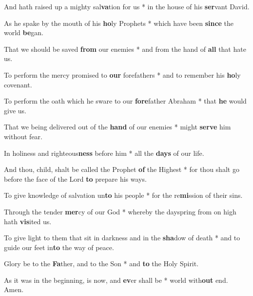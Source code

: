 \begin{multicols}{2}
	And hath raised up a mighty sal\textbf{va}tion for us * in the house of his \textbf{ser}vant David.
	
	As he spake by the mouth of his \textbf{ho}ly Prophets * which have been \textbf{since} the world \textbf{be}gan.
	
	That we should be saved \textbf{from} our enemies * and from the hand of \textbf{all} that hate us.
	
	To perform the mercy promised to \textbf{our} forefathers * and to remember his \textbf{ho}ly covenant.
	
	To perform the oath which he sware to our \textbf{fore}father Abraham * that \textbf{he} would give us.
	
	That we being delivered out of the \textbf{hand} of our enemies * might \textbf{serve} him without fear.
	
	In holiness and righteous\textbf{ness} before him * all the \textbf{days} of our life.
	
	And thou, child, shalt be called the Prophet \textbf{of} the Highest * for thou shalt go before the face of the Lord \textbf{to} prepare his ways.
	
	To give knowledge of salvation un\textbf{to} his people * for the re\textbf{mi}ssion of their sins.
	
	Through the tender \textbf{mer}cy of our God * whereby the dayspring from on high hath \textbf{vis}ited us.
	
	To give light to them that sit in darkness and in the \textbf{sha}dow of death * and to guide our feet in\textbf{to} the way of peace.
	
	Glory be to the \textbf{Fa}ther, and to the Son * and \textbf{to} the Holy Spirit.
	
	As it was in the beginning, is now, and \textbf{ev}er shall be * world with\textbf{out} end. Amen.
\end{multicols}